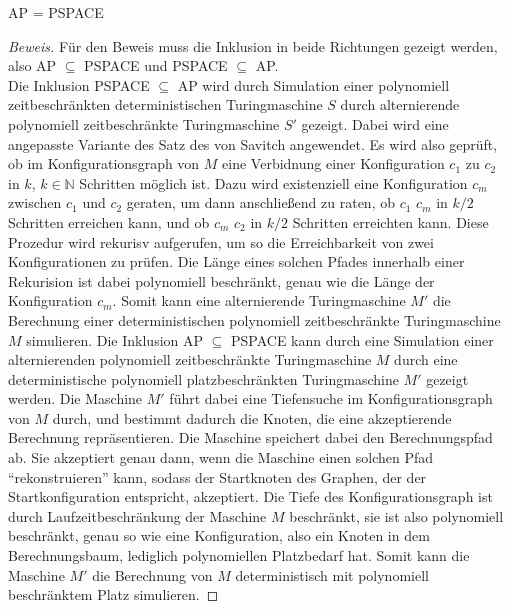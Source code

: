 \begin{theorem}
    AP = PSPACE
\end{theorem}

\begin{proof}[Beweis] \cite{sipser_introduction_2012}
    Für den Beweis muss die Inklusion in beide Richtungen gezeigt werden, also AP $\subseteq$ PSPACE und PSPACE $\subseteq$ AP. \\
    Die Inklusion PSPACE $\subseteq$ AP wird durch Simulation einer polynomiell zeitbeschränkten deterministischen Turingmaschine $S$ durch alternierende polynomiell zeitbeschränkte Turingmaschine $S'$ gezeigt.
    Dabei wird eine angepasste Variante des Satz des von Savitch angewendet. Es wird also geprüft, ob im Konfigurationsgraph von $M$ eine Verbidnung einer Konfiguration $c_1$ zu $c_2$ in $k$, $k \in \mathbb{N}$ Schritten möglich ist.
    Dazu wird existenziell eine Konfiguration $c_m$ zwischen $c_1$ und $c_2$ geraten, um dann anschließend zu raten, 
    ob $c_1$ $c_m$ in $k/2$ Schritten erreichen kann, und ob $c_m$ $c_2$ in $k/2$ Schritten erreichten kann. Diese Prozedur wird rekurisv aufgerufen,
    um so die Erreichbarkeit von zwei Konfigurationen zu prüfen. Die Länge eines solchen Pfades innerhalb einer Rekurision ist dabei polynomiell beschränkt, genau wie die Länge der Konfiguration $c_m$.
    Somit kann eine alternierende Turingmaschine $M'$ die Berechnung einer deterministischen polynomiell zeitbeschränkte Turingmaschine $M$ simulieren.  
    Die Inklusion AP $\subseteq$ PSPACE kann durch eine Simulation einer alternierenden polynomiell zeitbeschränkte Turingmaschine $M$ durch eine deterministische polynomiell platzbeschränkten Turingmaschine $M'$
    gezeigt werden. Die Maschine $M'$ führt dabei eine Tiefensuche im Konfigurationsgraph von $M$ durch, und bestimmt dadurch die Knoten, die eine akzeptierende Berechnung repräsentieren.
    Die Maschine speichert dabei den Berechnungspfad ab. Sie akzeptiert genau dann, wenn die Maschine einen solchen Pfad \enquote{rekonstruieren} kann, sodass der Startknoten des Graphen,
    der der Startkonfiguration entspricht, akzeptiert.
    Die Tiefe des Konfigurationsgraph ist durch Laufzeitbeschränkung der Maschine $M$ beschränkt, sie ist also polynomiell beschränkt, genau so wie eine Konfiguration, also ein Knoten in dem Berechnungsbaum,
    lediglich polynomiellen Platzbedarf hat. Somit kann die Maschine $M'$ die Berechnung von $M$ deterministisch mit polynomiell beschränktem Platz simulieren. 
\end{proof}